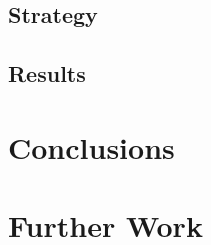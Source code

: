\documentclass[12pt, a4paper]{article}
\begin{document}
\subsection{Strategy}
\subsection{Results}

\section{Conclusions}

\section{Further Work}

 
        \newpage
 
\end{document}
